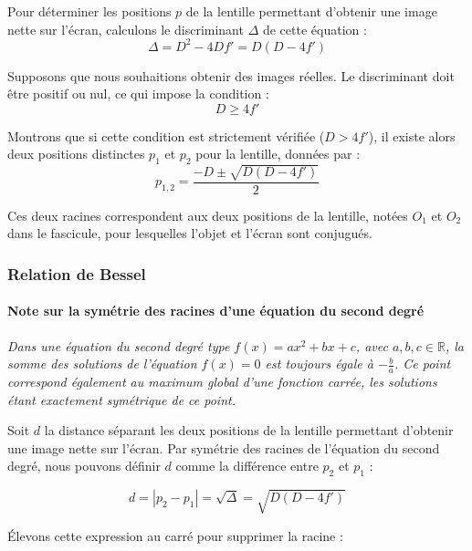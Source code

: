 Pour déterminer les positions $p$ de la lentille permettant d'obtenir une image nette sur l'écran, 
calculons le discriminant $\Delta$ de cette équation :
\begin{equation}
    \Delta = D^{2} - 4Df' = D(D - 4f')
\end{equation}

Supposons que nous souhaitions obtenir des images réelles. 
Le discriminant doit être positif ou nul, ce qui impose la condition :
\begin{equation}
    D \ge 4f'
\end{equation}

Montrons que si cette condition est strictement vérifiée ($D > 4f'$), 
il existe alors deux positions distinctes $p_{1}$ et $p_{2}$ pour la lentille, 
données par :
\begin{equation}
    p_{1,2} = \frac{-D \pm \sqrt{D(D - 4f')}}{2}
\end{equation}

Ces deux racines correspondent aux deux positions de la lentille, 
notées $O_{1}$ et $O_{2}$ dans le fascicule, 
pour lesquelles l'objet et l'écran sont conjugués.

\subsubsection{Relation de Bessel}

\paragraph{Note sur la symétrie des racines d'une équation du second degré}
\textit{Dans une équation du second degré type $f(x) = ax^2 + bx + c$, 
avec $a, b, c \in \mathbb{R}$, 
la somme des solutions de l'équation $f(x) = 0$ 
est toujours égale à $-\frac{b}{a}$.
Ce point correspond également au maximum global d'une fonction carrée, 
les solutions étant exactement symétrique de ce point.}

Soit $d$ la distance séparant les deux positions de la lentille 
permettant d'obtenir une image nette sur l'écran. 
Par symétrie des racines de l'équation du second degré, 
nous pouvons définir $d$ comme la différence entre $p_{2}$ et $p_{1}$ :

\begin{equation}
    d = |p_{2} - p_{1}| = \sqrt{\Delta} = \sqrt{D(D - 4f')}
\end{equation}

Élevons cette expression au carré pour supprimer la racine :

